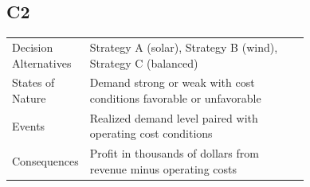 \begin{ExamProblems}
		\subsection*{C2}
		\begin{center}
			\begin{tabular}{l p{0.74\linewidth}}
				\toprule
				Decision Alternatives & Strategy A (solar), Strategy B (wind), Strategy C (balanced) \\
				States of Nature & Demand strong or weak with cost conditions favorable or unfavorable \\
				Events & Realized demand level paired with operating cost conditions \\
				Consequences & Profit in thousands of dollars from revenue minus operating costs \\
				\bottomrule
			\end{tabular}
		\end{center}


\end{ExamProblems}
